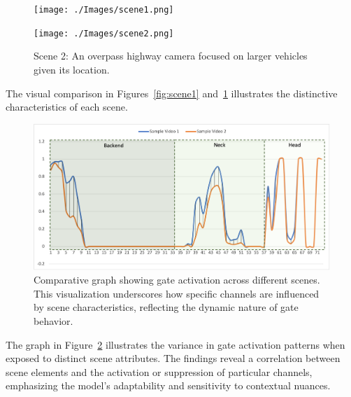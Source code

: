 \documentclass[runningheads]{llncs}
\begin{document}
\begin{figure}[ht]
    \centering
    \begin{minipage}{0.45\textwidth}
    \texttt{[image: ./Images/scene1.png]}
    \caption{Scene 1: An intersection with a broader spectrum of car sizes.}
    \label{fig:scene1}
    \end{minipage}
    \hfill
    \begin{minipage}{0.45\textwidth}
    \texttt{[image: ./Images/scene2.png]}
    \caption{Scene 2: An overpass highway camera focused on larger vehicles given its location.}
    \label{fig:scene2}
    \end{minipage}
    \end{figure}
    

The visual comparison in Figures~\ref{fig:scene1} and~\ref{fig:scene2} illustrates the distinctive characteristics of each scene.

\begin{figure}[ht]
\centering
\includegraphics[width=\linewidth]{./Images/vari-viod.png}
\caption{Comparative graph showing gate activation across different scenes. This visualization underscores how specific channels are influenced by scene characteristics, reflecting the dynamic nature of gate behavior.}
\label{fig:comparative_analysis}
\end{figure}

The graph in Figure~\ref{fig:comparative_analysis} illustrates the variance in gate activation patterns when exposed to distinct scene attributes. The findings reveal a correlation between scene elements and the activation or suppression of particular channels, emphasizing the model's adaptability and sensitivity to contextual nuances.
\end{document}
